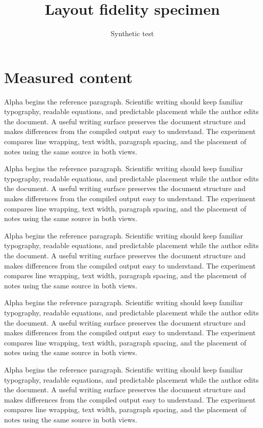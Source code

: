 \documentclass[10pt,twocolumn]{article}
\title{Layout fidelity specimen}
\author{Synthetic test}
\date{}
\begin{document}
\maketitle
\section{Measured content}
Alpha begins the reference paragraph. Scientific writing should keep familiar typography, readable equations, and predictable placement while the author edits the document. A useful writing surface preserves the document structure and makes differences from the compiled output easy to understand. The experiment compares line wrapping, text width, paragraph spacing, and the placement of notes using the same source in both views.

Alpha begins the reference paragraph. Scientific writing should keep familiar typography, readable equations, and predictable placement while the author edits the document. A useful writing surface preserves the document structure and makes differences from the compiled output easy to understand. The experiment compares line wrapping, text width, paragraph spacing, and the placement of notes using the same source in both views.

Alpha begins the reference paragraph. Scientific writing should keep familiar typography, readable equations, and predictable placement while the author edits the document. A useful writing surface preserves the document structure and makes differences from the compiled output easy to understand. The experiment compares line wrapping, text width, paragraph spacing, and the placement of notes using the same source in both views.

Alpha begins the reference paragraph. Scientific writing should keep familiar typography, readable equations, and predictable placement while the author edits the document. A useful writing surface preserves the document structure and makes differences from the compiled output easy to understand. The experiment compares line wrapping, text width, paragraph spacing, and the placement of notes using the same source in both views.

Alpha begins the reference paragraph. Scientific writing should keep familiar typography, readable equations, and predictable placement while the author edits the document. A useful writing surface preserves the document structure and makes differences from the compiled output easy to understand. The experiment compares line wrapping, text width, paragraph spacing, and the placement of notes using the same source in both views.
\end{document}
